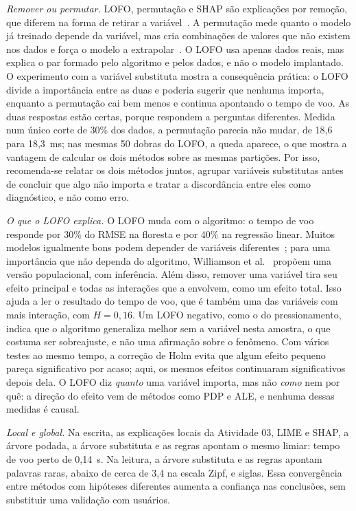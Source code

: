 \documentclass[conference]{IEEEtran}
\begin{document}
\emph{Remover ou permutar.} LOFO, permutação e SHAP são explicações por
remoção, que diferem na forma de retirar a variável~\cite{covert2021explaining}.
A permutação mede quanto o modelo já treinado depende da variável, mas cria
combinações de valores que não existem nos dados e força o modelo a
extrapolar~\cite{hooker2021permutation}. O LOFO usa apenas dados reais, mas
explica o par formado pelo algoritmo e pelos dados, e não o modelo implantado.
O experimento com a variável substituta mostra a consequência prática: o LOFO
divide a importância entre as duas e poderia sugerir que nenhuma importa,
enquanto a permutação cai bem menos e continua apontando o tempo de voo. As duas
respostas estão certas, porque respondem a perguntas diferentes. Medida num
único corte de 30\% dos dados, a permutação parecia não mudar, de 18,6 para
18,3~ms; nas mesmas 50 dobras do LOFO, a queda aparece, o que mostra a vantagem
de calcular os dois métodos sobre as mesmas partições. Por isso, recomenda-se
relatar os dois métodos juntos, agrupar variáveis substitutas antes de concluir
que algo não importa e tratar a discordância entre eles como diagnóstico, e não
como erro.

\emph{O que o LOFO explica.} O LOFO muda com o algoritmo: o tempo de voo
responde por 30\% do RMSE na floresta e por 40\% na regressão linear. Muitos
modelos igualmente bons podem depender de variáveis
diferentes~\cite{fisher2019all}; para uma importância que não dependa do
algoritmo, Williamson et al.~\cite{williamson2023general} propõem uma versão
populacional, com inferência. Além disso, remover uma variável tira seu efeito
principal e todas as interações que a envolvem, como um efeito total. Isso ajuda
a ler o resultado do tempo de voo, que é também uma das variáveis com mais
interação, com $H = 0,16$. Um LOFO negativo, como o do pressionamento, indica
que o algoritmo generaliza melhor sem a variável nesta amostra, o que costuma
ser sobreajuste, e não uma afirmação sobre o fenômeno. Com vários testes ao
mesmo tempo, a correção de Holm evita que algum efeito pequeno pareça
significativo por acaso; aqui, os mesmos efeitos continuaram significativos
depois dela. O LOFO diz \emph{quanto} uma variável importa, mas não \emph{como}
nem por quê: a direção do efeito vem de métodos como PDP e ALE, e nenhuma
dessas medidas é causal.

\emph{Local e global.} Na escrita, as explicações locais da Atividade 03, LIME e
SHAP, a árvore podada, a árvore substituta e as regras apontam o mesmo limiar:
tempo de voo perto de 0,14~s. Na leitura, a árvore substituta e as regras
apontam palavras raras, abaixo de cerca de 3,4 na escala Zipf, e siglas. Essa
convergência entre métodos com hipóteses diferentes aumenta a confiança nas
conclusões, sem substituir uma validação com usuários.
\end{document}
